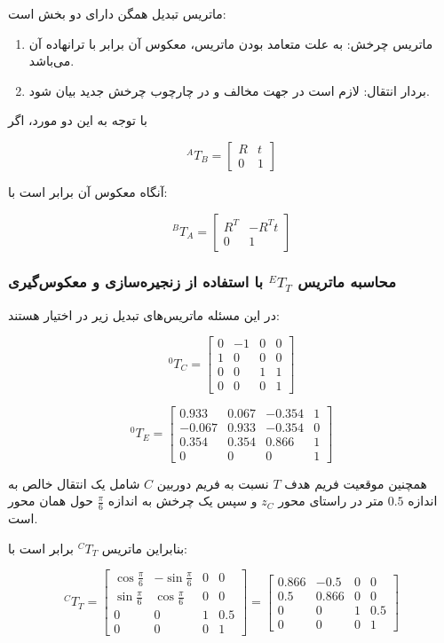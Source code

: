 \documentclass{article}
\begin{document}
ماتریس تبدیل همگن دارای دو بخش است:
\begin{enumerate}
	\item ماتریس چرخش: به علت متعامد بودن ماتریس، معکوس آن برابر با ترانهاده آن می‌باشد.
	\item بردار انتقال: لازم است در جهت مخالف و در چارچوب چرخش جدید بیان شود.
\end{enumerate}
با توجه به این دو مورد، اگر

\[
{}^{A}T_B = \begin{bmatrix}
	R & t\\
	0 & 1
\end{bmatrix}
\]

آنگاه معکوس آن برابر است با:

\[
{}^{B}T_A = \begin{bmatrix}
	R^T & -R^T t \\
	0 & 1
\end{bmatrix}
\]

\subsubsection{محاسبه ماتریس \({}^{E}T_{T}\) با استفاده از زنجیره‌سازی و معکوس‌گیری}

در این مسئله ماتریس‌های تبدیل زیر در اختیار هستند:

\[
{}^{0}T_{C}=
\begin{bmatrix}
	0 & -1 & 0 & 0\\
	1 & 0 & 0 & 0\\
	0 & 0 & 1 & 1\\
	0 & 0 & 0 & 1
\end{bmatrix}
\]

\[
{}^{0}T_{E}=
\begin{bmatrix}
	0.933 & 0.067 & -0.354 & 1\\
	-0.067 & 0.933 & -0.354 & 0\\
	0.354 & 0.354 & 0.866 & 1\\
	0 &0 &0 &1
\end{bmatrix}
\]

همچنین موقعیت فریم هدف \(T\) نسبت به فریم دوربین \(C\) شامل یک انتقال خالص به اندازه \(0.5\) متر در راستای محور \(z_C\) و سپس یک چرخش به اندازه \(\frac{\pi}{6}\) حول همان محور است.

بنابراین ماتریس \({}^{C}T_{T}\) برابر است با:

\[
{}^{C}T_{T}=
\begin{bmatrix}
	\cos\frac{\pi}{6} & -\sin\frac{\pi}{6} & 0 & 0\\
	\sin\frac{\pi}{6} & \cos\frac{\pi}{6} & 0 & 0\\
	0 & 0 & 1 & 0.5\\
	0 & 0 & 0 & 1
\end{bmatrix}
=
\begin{bmatrix}
	0.866 & -0.5 & 0 & 0\\
	0.5 & 0.866 & 0 & 0\\
	0 & 0 & 1 & 0.5\\
	0 & 0 & 0 & 1
\end{bmatrix}
\]
\end{document}
